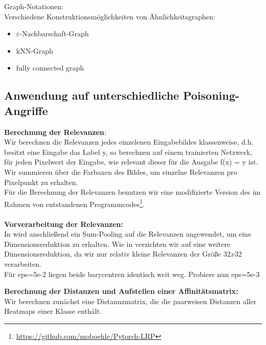 \documentclass[twoside, 12pt,a4paper]{article}
\numberwithin{equation}{section}
\begin{document}
	
	Graph-Notationen:\\
	
	Verschiedene Konstruktionsmöglichkeiten von Ähnlichkeitsgraphen:
	
	\begin{itemize}
		\item $\varepsilon$-Nachbarschaft-Graph\\
		\item kNN-Graph\\
		\item fully connected graph
	\end{itemize}
	
	
	\subsection{Anwendung auf unterschiedliche Poisoning-Angriffe} \label{chapter_results} \label{chapter_experiments}
	\noindent \textbf{Berechnung der Relevanzen}:\\
	
	\noindent Wir berechnen die Relevanzen jedes einzelenen Eingabebildes klassenweise, d.h. besitzt eine Eingabe das Label y, so berechnen auf einem trainierten Netzwerk, für jeden Pixelwert der Eingabe, wie relevant dieser für die Ausgabe f(x) = y ist.\\
	Wir summieren über die Farbaxen des Bildes, um einzelne Relevanzen pro Pixelpunkt zu erhalten.\\
	Für die Berechnung der Relevanzen benutzen wir eine modifizierte Version des im Rahmen von \cite{lrp_alzheimer} entstandenen Programmcodes\footnote{\url{https://github.com/moboehle/Pytorch-LRP}}.\\
	\\
	\noindent \textbf{Vorverarbeitung der Relevanzen:}\\
	In \cite{unmaskingCH} wird anschließend ein Sum-Pooling auf die Relevanzen angewendet, um eine Dimensionsreduktion zu erhalten. Wie in \cite{imagenet_unhansed_v1} verzichten wir auf eine weitere Dimensionsreduktion, da wir nur relativ kleine Relevanzen der Größe $32x32$ verarbeiten.	\\
	
	Für eps=5e-2 liegen beide barycentren identisch weit weg. Probiere nun eps=5e-3
	
	\noindent \textbf{Berechnung der Distanzen und Aufstellen einer Affinitätsmatrix:}\\
	
	Wir berechnen zunächst eine Distannzmatrix, die die paarweisen Distanzen aller Heatmaps einer Klasse enthält.	
	
\end{document}
